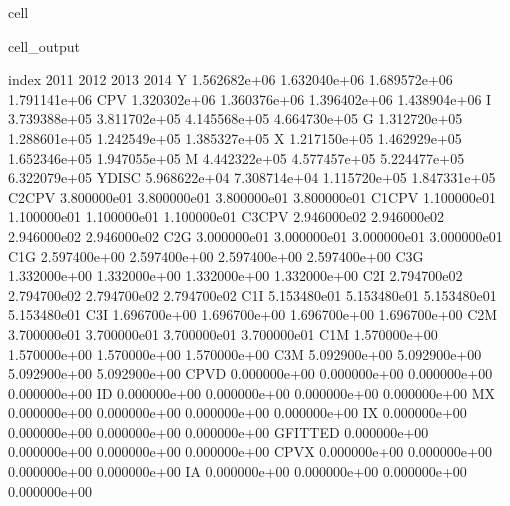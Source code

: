 \documentclass[letterpaper,10pt,english]{jupyterBook}
\begin{document}
\begin{sphinxuseclass}{cell}
\begin{sphinxVerbatimOutput}
\begin{sphinxuseclass}{cell_output}
\begin{sphinxVerbatim}[commandchars=\\\{\}]
index               2011          2012          2013          2014  \PYGZbs{}
Y           1.562682e+06  1.632040e+06  1.689572e+06  1.791141e+06   
CPV         1.320302e+06  1.360376e+06  1.396402e+06  1.438904e+06   
I           3.739388e+05  3.811702e+05  4.145568e+05  4.664730e+05   
G           1.312720e+05  1.288601e+05  1.242549e+05  1.385327e+05   
X           1.217150e+05  1.462929e+05  1.652346e+05  1.947055e+05   
M           4.442322e+05  4.577457e+05  5.224477e+05  6.322079e+05   
YDISC       5.968622e+04  7.308714e+04  1.115720e+05  1.847331e+05   
C2\PYGZus{}CPV      3.800000e\PYGZhy{}01  3.800000e\PYGZhy{}01  3.800000e\PYGZhy{}01  3.800000e\PYGZhy{}01   
C1\PYGZus{}CPV     \PYGZhy{}1.100000e\PYGZhy{}01 \PYGZhy{}1.100000e\PYGZhy{}01 \PYGZhy{}1.100000e\PYGZhy{}01 \PYGZhy{}1.100000e\PYGZhy{}01   
C3\PYGZus{}CPV      2.946000e\PYGZhy{}02  2.946000e\PYGZhy{}02  2.946000e\PYGZhy{}02  2.946000e\PYGZhy{}02   
C2\PYGZus{}G        3.000000e\PYGZhy{}01  3.000000e\PYGZhy{}01  3.000000e\PYGZhy{}01  3.000000e\PYGZhy{}01   
C1\PYGZus{}G       \PYGZhy{}2.597400e+00 \PYGZhy{}2.597400e+00 \PYGZhy{}2.597400e+00 \PYGZhy{}2.597400e+00   
C3\PYGZus{}G        1.332000e+00  1.332000e+00  1.332000e+00  1.332000e+00   
C2\PYGZus{}I        2.794700e\PYGZhy{}02  2.794700e\PYGZhy{}02  2.794700e\PYGZhy{}02  2.794700e\PYGZhy{}02   
C1\PYGZus{}I       \PYGZhy{}5.153480e\PYGZhy{}01 \PYGZhy{}5.153480e\PYGZhy{}01 \PYGZhy{}5.153480e\PYGZhy{}01 \PYGZhy{}5.153480e\PYGZhy{}01   
C3\PYGZus{}I        1.696700e+00  1.696700e+00  1.696700e+00  1.696700e+00   
C2\PYGZus{}M        3.700000e\PYGZhy{}01  3.700000e\PYGZhy{}01  3.700000e\PYGZhy{}01  3.700000e\PYGZhy{}01   
C1\PYGZus{}M       \PYGZhy{}1.570000e+00 \PYGZhy{}1.570000e+00 \PYGZhy{}1.570000e+00 \PYGZhy{}1.570000e+00   
C3\PYGZus{}M        5.092900e+00  5.092900e+00  5.092900e+00  5.092900e+00   
CPV\PYGZus{}D       0.000000e+00  0.000000e+00  0.000000e+00  0.000000e+00   
I\PYGZus{}D         0.000000e+00  0.000000e+00  0.000000e+00  0.000000e+00   
M\PYGZus{}X         0.000000e+00  0.000000e+00  0.000000e+00  0.000000e+00   
I\PYGZus{}X         0.000000e+00  0.000000e+00  0.000000e+00  0.000000e+00   
G\PYGZus{}FITTED    0.000000e+00  0.000000e+00  0.000000e+00  0.000000e+00   
CPV\PYGZus{}X       0.000000e+00  0.000000e+00  0.000000e+00  0.000000e+00   
I\PYGZus{}A         0.000000e+00  0.000000e+00  0.000000e+00  0.000000e+00   

\end{sphinxVerbatim}
\end{sphinxuseclass}
\end{sphinxVerbatimOutput}
\end{sphinxuseclass}
\end{document}
